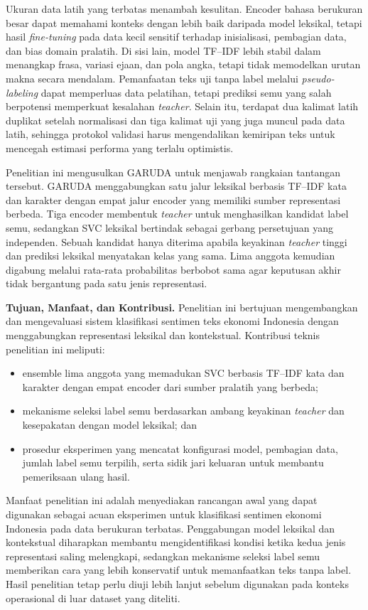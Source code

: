 Ukuran data latih yang terbatas menambah kesulitan. Encoder bahasa berukuran besar dapat memahami konteks dengan lebih baik daripada model leksikal, tetapi hasil \textit{fine-tuning} pada data kecil sensitif terhadap inisialisasi, pembagian data, dan bias domain pralatih. Di sisi lain, model TF--IDF lebih stabil dalam menangkap frasa, variasi ejaan, dan pola angka, tetapi tidak memodelkan urutan makna secara mendalam. Pemanfaatan teks uji tanpa label melalui \textit{pseudo-labeling} dapat memperluas data pelatihan, tetapi prediksi semu yang salah berpotensi memperkuat kesalahan \textit{teacher}. Selain itu, terdapat dua kalimat latih duplikat setelah normalisasi dan tiga kalimat uji yang juga muncul pada data latih, sehingga protokol validasi harus mengendalikan kemiripan teks untuk mencegah estimasi performa yang terlalu optimistis.

Penelitian ini mengusulkan GARUDA untuk menjawab rangkaian tantangan tersebut. GARUDA menggabungkan satu jalur leksikal berbasis TF--IDF kata dan karakter dengan empat jalur encoder yang memiliki sumber representasi berbeda. Tiga encoder membentuk \textit{teacher} untuk menghasilkan kandidat label semu, sedangkan SVC leksikal bertindak sebagai gerbang persetujuan yang independen. Sebuah kandidat hanya diterima apabila keyakinan \textit{teacher} tinggi dan prediksi leksikal menyatakan kelas yang sama. Lima anggota kemudian digabung melalui rata-rata probabilitas berbobot sama agar keputusan akhir tidak bergantung pada satu jenis representasi.

\textbf{Tujuan, Manfaat, dan Kontribusi.} Penelitian ini bertujuan mengembangkan dan mengevaluasi sistem klasifikasi sentimen teks ekonomi Indonesia dengan menggabungkan representasi leksikal dan kontekstual. Kontribusi teknis penelitian ini meliputi:
\begin{itemize}
    \item ensemble lima anggota yang memadukan SVC berbasis TF--IDF kata dan karakter dengan empat encoder dari sumber pralatih yang berbeda;
    \item mekanisme seleksi label semu berdasarkan ambang keyakinan \textit{teacher} dan kesepakatan dengan model leksikal; dan
    \item prosedur eksperimen yang mencatat konfigurasi model, pembagian data, jumlah label semu terpilih, serta sidik jari keluaran untuk membantu pemeriksaan ulang hasil.
\end{itemize}
Manfaat penelitian ini adalah menyediakan rancangan awal yang dapat digunakan sebagai acuan eksperimen untuk klasifikasi sentimen ekonomi Indonesia pada data berukuran terbatas. Penggabungan model leksikal dan kontekstual diharapkan membantu mengidentifikasi kondisi ketika kedua jenis representasi saling melengkapi, sedangkan mekanisme seleksi label semu memberikan cara yang lebih konservatif untuk memanfaatkan teks tanpa label. Hasil penelitian tetap perlu diuji lebih lanjut sebelum digunakan pada konteks operasional di luar dataset yang diteliti.

